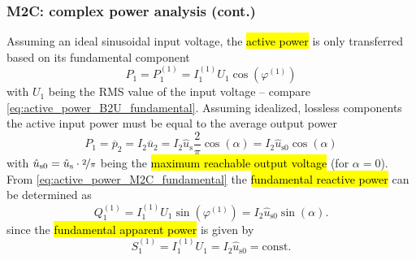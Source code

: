 \begin{frame}[c]
    \frametitle{M2C: complex power analysis (cont.)}
    Assuming an ideal sinusoidal input voltage, the \hl{active power} is only transferred based on its fundamental component
    \begin{equation}
        P_1 = P_1^{(1)} = I_1^{(1)}U_1\cos(\varphi^{(1)})  
        \label{eq:active_power_M2C_fundamental}
    \end{equation}
    with $U_1$ being the RMS value of the input voltage -- compare \eqref{eq:active_power_B2U_fundamental}. Assuming idealized, lossless components the active input power must be equal to the average output power
    \begin{equation}
        P_1 = \overline{p}_2 = I_2 \overline{u}_2 = I_2 \hat{u}_\mathrm{s} \frac{2}{\pi} \cos(\alpha) = I_2 \hat{u}_\mathrm{s0} \cos(\alpha)
        \label{eq:active_power_M2C_output}
    \end{equation} 
    with $\hat{u}_\mathrm{s0} = \hat{u}_\mathrm{s} \cdot \nicefrac{2}{\pi}$ being the \hl{maximum reachable output voltage} (for $\alpha=0$).  From \eqref{eq:active_power_M2C_fundamental} the \hl{fundamental reactive power} can be determined as
    \begin{equation}
        Q_1^{(1)} = I_1^{(1)}U_1\sin(\varphi^{(1)}) = I_2 \hat{u}_\mathrm{s0} \sin(\alpha).
    \end{equation}
    since the \hl{fundamental apparent power} is given by
    \begin{equation}
        S_1^{(1)} = I_1^{(1)}U_1 = I_2 \hat{u}_\mathrm{s0} = \mbox{const}.
    \end{equation}
\end{frame}

